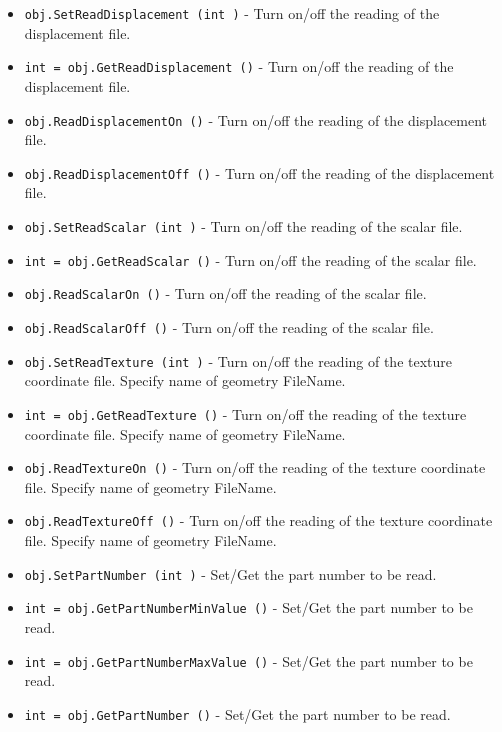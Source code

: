 \begin{itemize}
\item  \verb|obj.SetReadDisplacement (int )| -  Turn on/off the reading of the displacement file.

\item  \verb|int = obj.GetReadDisplacement ()| -  Turn on/off the reading of the displacement file.

\item  \verb|obj.ReadDisplacementOn ()| -  Turn on/off the reading of the displacement file.

\item  \verb|obj.ReadDisplacementOff ()| -  Turn on/off the reading of the displacement file.

\item  \verb|obj.SetReadScalar (int )| -  Turn on/off the reading of the scalar file.

\item  \verb|int = obj.GetReadScalar ()| -  Turn on/off the reading of the scalar file.

\item  \verb|obj.ReadScalarOn ()| -  Turn on/off the reading of the scalar file.

\item  \verb|obj.ReadScalarOff ()| -  Turn on/off the reading of the scalar file.

\item  \verb|obj.SetReadTexture (int )| -  Turn on/off the reading of the texture coordinate file.
 Specify name of geometry FileName.

\item  \verb|int = obj.GetReadTexture ()| -  Turn on/off the reading of the texture coordinate file.
 Specify name of geometry FileName.

\item  \verb|obj.ReadTextureOn ()| -  Turn on/off the reading of the texture coordinate file.
 Specify name of geometry FileName.

\item  \verb|obj.ReadTextureOff ()| -  Turn on/off the reading of the texture coordinate file.
 Specify name of geometry FileName.

\item  \verb|obj.SetPartNumber (int )| -  Set/Get the part number to be read.

\item  \verb|int = obj.GetPartNumberMinValue ()| -  Set/Get the part number to be read.

\item  \verb|int = obj.GetPartNumberMaxValue ()| -  Set/Get the part number to be read.

\item  \verb|int = obj.GetPartNumber ()| -  Set/Get the part number to be read.

\end{itemize}

